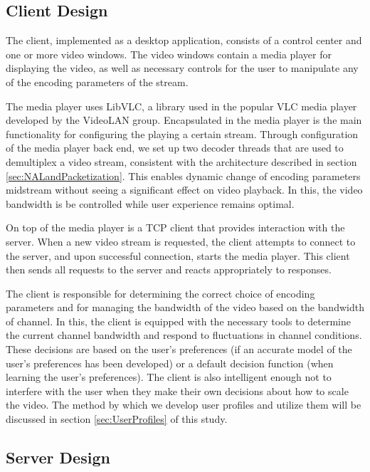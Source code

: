 \subsection{Client Design}

The client, implemented as a desktop application, consists of a control center and one or more video windows. The video windows contain a media player for displaying the video, as well as necessary controls for the user to manipulate any of the encoding parameters of the stream. 

The media player uses LibVLC, a library used in the popular VLC media player developed by the VideoLAN group. Encapsulated in the media player is the main functionality for configuring the playing a certain stream. Through configuration of the media player back end, we set up two decoder threads that are used to demultiplex a video stream, consistent with the architecture described in section \ref{sec:NALandPacketization}. This enables dynamic change of encoding parameters midstream without seeing a significant effect on video playback. In this, the video bandwidth is be controlled while user experience remains optimal.

On top of the media player is a TCP client that provides interaction with the server. When a new video stream is requested, the client attempts to connect to the server, and upon successful connection, starts the media player. This client then sends all requests to the server and reacts appropriately to responses.

The client is responsible for determining the correct choice of encoding parameters and for managing the bandwidth of the video based on the bandwidth of channel. In this, the client is equipped with the necessary tools to determine the current channel bandwidth and respond to fluctuations in channel conditions. These decisions are based on the user's preferences (if an accurate model of the user’s preferences has been developed) or a default decision function (when learning the user’s preferences). The client is also intelligent enough not to interfere with the user when they make their own decisions about how to scale the video. The method by which we develop user profiles and utilize them will be discussed in section \ref{sec:UserProfiles} of this study.

\subsection{Server Design}

